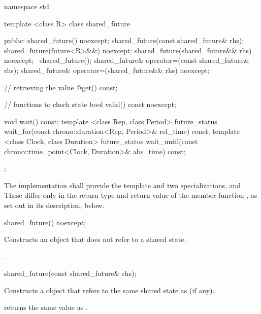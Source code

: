 \begin{codeblock}
namespace std {
  template <class R>
  class shared_future {
  public:
    shared_future() noexcept;
    shared_future(const shared_future& rhs);
    shared_future(future<R>&&) noexcept;
    shared_future(shared_future&& rhs) noexcept;
    ~shared_future();
    shared_future& operator=(const shared_future& rhs);
    shared_future& operator=(shared_future&& rhs) noexcept;

    // retrieving the value
    @\seebelow@ get() const;

    // functions to check state
    bool valid() const noexcept;

    void wait() const;
    template <class Rep, class Period>
      future_status wait_for(const chrono::duration<Rep, Period>& rel_time) const;
    template <class Clock, class Duration>
      future_status wait_until(const chrono::time_point<Clock, Duration>& abs_time) const;
  };
}
\end{codeblock}

\pnum
The implementation shall provide the template  and two
specializations,  and . These
differ only in the return type and return value of the member function , as
set out in its description, below.

%
\begin{itemdecl}
shared_future() noexcept;
\end{itemdecl}

\begin{itemdescr}
\pnum
\effects Constructs an   object that does not refer to a
shared state.

\pnum
\postcondition {}.
\end{itemdescr}

%
\begin{itemdecl}
shared_future(const shared_future& rhs);
\end{itemdecl}

\begin{itemdescr}
\pnum
\effects Constructs a  object that refers to the same
shared state as  (if any).

\pnum
\postcondition {} returns the same value as .
\end{itemdescr}

